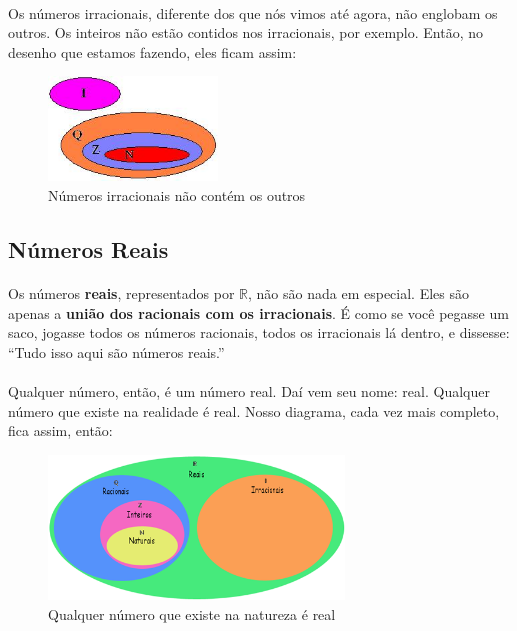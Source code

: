 \documentclass[11pt]{article}
\begin{document}
\paragraph{}
Os números irracionais, diferente dos que nós vimos até agora, não englobam os
outros. Os inteiros não estão contidos nos irracionais, por exemplo. Então, no
desenho que estamos fazendo, eles ficam assim:
\begin{figure}[H]
	\centering
	\includegraphics[width=0.4\textwidth]{imgs/n_z_q_i.jpg}
	\caption[9pt]{Números irracionais não contém os outros}
\end{figure}

\subsection{Números Reais}
\paragraph{}
Os números \textbf{reais}, representados por $\mathbb{R}$, não são nada em 
especial. Eles são apenas a \textbf{união dos racionais com os irracionais}. 
É como se você pegasse um saco, jogasse todos os números racionais, todos os
irracionais lá dentro, e dissesse: ``Tudo isso aqui são números reais.''
\paragraph{}
Qualquer número, então, é um número real. Daí vem seu nome: real. Qualquer 
número que existe na realidade é real. Nosso diagrama, cada vez mais completo,
fica assim, então:
\begin{figure}[H]
	\centering
	\includegraphics[width=0.7\textwidth]{imgs/n_z_q_i_r.png}
	\caption[9pt]{Qualquer número que existe na natureza é real}
\end{figure}
\end{document}
